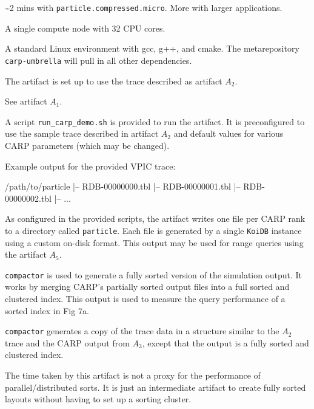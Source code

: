 \documentclass[conference]{IEEEtran}
\newenvironment{example}
{\minted[bgcolor=GhostWhite,fontsize=\small]{text}}
{\endminted}
\begin{document}
\arttime

\textasciitilde2 mins with \texttt{particle.compressed.micro}. More with larger applications.

\artin

 A single compute node with 32 CPU cores.

 A standard Linux environment with gcc, g++, and cmake. The metarepository \texttt{carp-umbrella} will pull in all other dependencies.

 The artifact is set up to use the trace described as artifact $A_2$.

 See artifact $A_1$.

\artcomp

A script \texttt{run\_carp\_demo.sh} is provided to run the artifact. It is preconfigured to use the sample trace described in artifact $A_2$ and default values for various CARP parameters (which may be changed).

\artout

Example output for the provided VPIC trace:

\begin{example}
/path/to/particle
|-- RDB-00000000.tbl
|-- RDB-00000001.tbl
|-- RDB-00000002.tbl
|-- ...
\end{example}

As configured in the provided scripts, the artifact writes one file per CARP rank to a directory called \texttt{particle}. Each file is generated by a single \texttt{KoiDB} instance using a custom on-disk format. This output may be used for range queries using the artifact $A_5$.


\newartifact

\artrel

\texttt{compactor} is used to generate a fully sorted version of the simulation output. It works by merging CARP's partially sorted output files into a full sorted and clustered index.
This output is used to measure the query performance of a sorted index in Fig 7a.

\artexp

\texttt{compactor} generates a copy of the trace data in a structure similar to the $A_2$ trace and the CARP output from $A_3$, except that the output is a fully sorted and clustered index.

The time taken by this artifact is not a proxy for the performance of parallel/distributed sorts. It is just an intermediate artifact to create fully sorted layouts without having to set up a sorting cluster.
\end{document}
